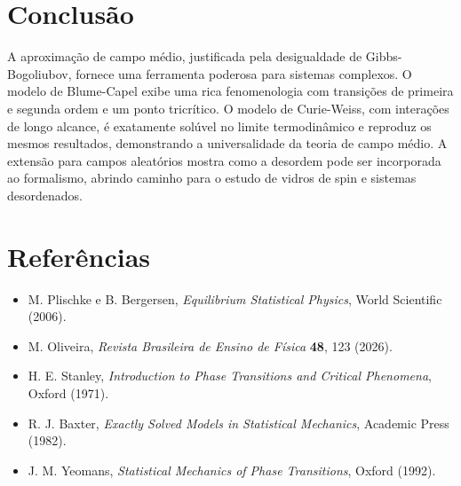 \documentclass[12pt]{article}
\begin{document}
\section{Conclusão}

A aproximação de campo médio, justificada pela desigualdade de Gibbs-Bogoliubov, fornece uma ferramenta poderosa para sistemas complexos. O modelo de Blume-Capel exibe uma rica fenomenologia com transições de primeira e segunda ordem e um ponto tricrítico. O modelo de Curie-Weiss, com interações de longo alcance, é exatamente solúvel no limite termodinâmico e reproduz os mesmos resultados, demonstrando a universalidade da teoria de campo médio. A extensão para campos aleatórios mostra como a desordem pode ser incorporada ao formalismo, abrindo caminho para o estudo de vidros de spin e sistemas desordenados.

\section*{Referências}

\begin{itemize}
    \item M. Plischke e B. Bergersen, \textit{Equilibrium Statistical Physics}, World Scientific (2006).
    \item M. Oliveira, \textit{Revista Brasileira de Ensino de Física} \textbf{48}, 123 (2026).
    \item H. E. Stanley, \textit{Introduction to Phase Transitions and Critical Phenomena}, Oxford (1971).
    \item R. J. Baxter, \textit{Exactly Solved Models in Statistical Mechanics}, Academic Press (1982).
    \item J. M. Yeomans, \textit{Statistical Mechanics of Phase Transitions}, Oxford (1992).
\end{itemize}
\end{document}
